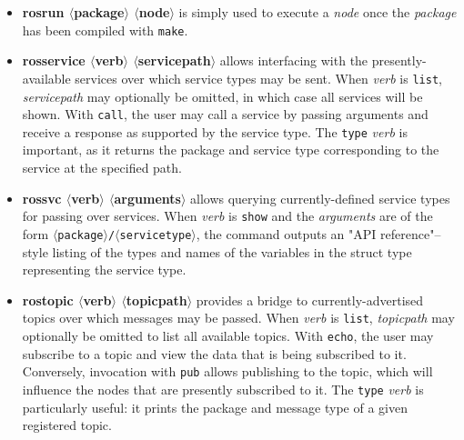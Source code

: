 \documentclass[12pt]{report}
\begin{document}
\begin{itemize}
\item{\textbf{rosrun $\langle$package$\rangle$ $\langle$node$\rangle$} is simply used to execute a \textit{node} once the \textit{package} has been compiled with \texttt{make}.}
\item{\textbf{rosservice $\langle$verb$\rangle$ $\langle$servicepath$\rangle$} allows interfacing with the presently-available services over which service types may be sent.  When \textit{verb} is \texttt{list}, \textit{servicepath} may optionally be omitted, in which case all services will be shown.  With \texttt{call}, the user may call a service by passing arguments and receive a response as supported by the service type.  The \texttt{type} \textit{verb} is important, as it returns the package and service type corresponding to the service at the specified path.}
\item{\textbf{rossvc $\langle$verb$\rangle$ $\langle$arguments$\rangle$} allows querying currently-defined service types for passing over services.  When \textit{verb} is \texttt{show} and the \textit{arguments} are of the form \texttt{$\langle$package$\rangle$/$\langle$servicetype$\rangle$}, the command outputs an "API reference"--style listing of the types and names of the variables in the struct type representing the service type.}
\item{\textbf{rostopic $\langle$verb$\rangle$ $\langle$topicpath$\rangle$} provides a bridge to currently-advertised topics over which messages may be passed.  When \textit{verb} is \texttt{list}, \textit{topicpath} may optionally be omitted to list all available topics.  With \texttt{echo}, the user may subscribe to a topic and view the data that is being subscribed to it.  Conversely, invocation with \texttt{pub} allows publishing to the topic, which will influence the nodes that are presently subscribed to it.  The \texttt{type} \textit{verb} is particularly useful: it prints the package and message type of a given registered topic.}
\end{itemize}
\end{document}
